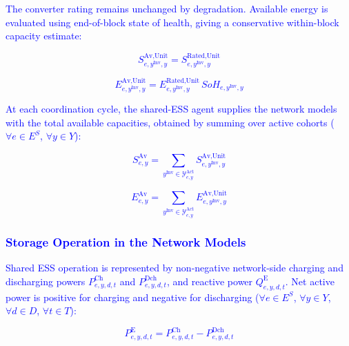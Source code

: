 \documentclass[preprint,12pt]{elsarticle}
\begin{document}
\textcolor{blue}{
    The converter rating remains unchanged by degradation. Available energy is evaluated using end-of-block state of health, giving a conservative within-block capacity estimate:
}

\textcolor{blue}{
    \begin{equation}
        S^{\text{Av,Unit}}_{e,y^\text{Inv},y} = S^{\text{Rated,Unit}}_{e,y^\text{Inv},y}
        \label{eq:cohort_available}
    \end{equation}
}

\textcolor{blue}{
    \begin{equation}
        E^{\text{Av,Unit}}_{e,y^\text{Inv},y} = E^{\text{Rated,Unit}}_{e,y^\text{Inv},y}\, SoH_{e,y^\text{Inv},y}
        \label{eq:cohort_available_energy}
    \end{equation}
}

\textcolor{blue}{
    At each coordination cycle, the shared-ESS agent supplies the network models with the total available capacities, obtained by summing over active cohorts ($\forall e\in E^S$, $\forall y\in Y$):
}

\textcolor{blue}{
    \begin{equation}
        S^{\text{Av}}_{e,y} = \sum_{y^{\text{Inv}}\in\mathcal{Y}^{\text{Act}}_{e,y}} S^{\text{Av,Unit}}_{e,y^{\text{Inv}},y}
        \label{eq:available_power}
    \end{equation}
}

\textcolor{blue}{
    \begin{equation}
        E^{\text{Av}}_{e,y} = \sum_{y^{\text{Inv}}\in\mathcal{Y}^{\text{Act}}_{e,y}} E^{\text{Av,Unit}}_{e,y^{\text{Inv}},y}
        \label{eq:available_capacity}
    \end{equation}
}

\subsubsection{\textcolor{blue}{Storage Operation in the Network Models}}
\label{subsubsec:network_storage}

\textcolor{blue}{
    Shared ESS operation is represented by non-negative network-side charging and discharging powers $P^{\text{Ch}}_{e,y,d,t}$ and $P^{\text{Dch}}_{e,y,d,t}$, and reactive power $Q^{\text{E}}_{e,y,d,t}$. Net active power is positive for charging and negative for discharging ($\forall e\in E^S$, $\forall y\in Y$, $\forall d\in D$, $\forall t\in T$):
}

\textcolor{blue}{
    \begin{equation}
        P^{\text{E}}_{e,y,d,t}
        =
        P^{\text{Ch}}_{e,y,d,t}
        -
        P^{\text{Dch}}_{e,y,d,t}
        \label{eq:storage_net_active_power}
    \end{equation}
}
\end{document}
